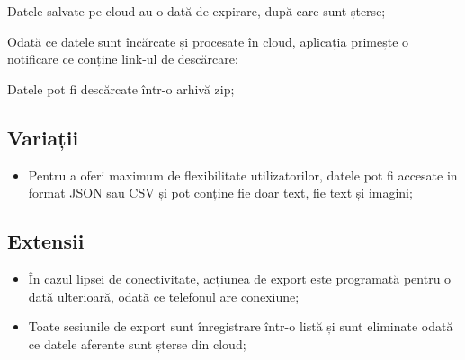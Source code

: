 Datele salvate pe cloud au o dată de expirare, după care sunt șterse;

Odată ce datele sunt încărcate și procesate în cloud, aplicația primește o notificare ce conține link-ul de descărcare;

Datele pot fi descărcate într-o arhivă zip;

\subsection{Variații}\label{variaux21bii-2}

\begin{itemize}
\item
  Pentru a oferi maximum de flexibilitate utilizatorilor, datele pot fi accesate in format JSON sau CSV și pot conține fie doar text, fie text și imagini;
\end{itemize}

\subsection{Extensii}\label{extensii-2}

\begin{itemize}
\item
  În cazul lipsei de conectivitate, acțiunea de export este programată pentru o dată ulterioară, odată ce telefonul are conexiune;
\item
  Toate sesiunile de export sunt înregistrare într-o listă și sunt eliminate odată ce datele aferente sunt șterse din cloud;
\end{itemize}
